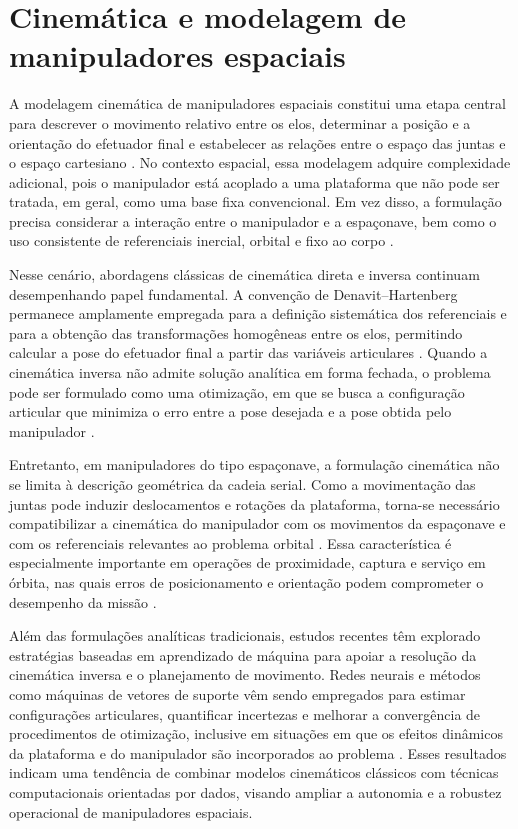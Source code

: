 \section{Cinemática e modelagem de manipuladores espaciais} %

A modelagem cinemática de manipuladores espaciais constitui uma etapa central para descrever o movimento relativo entre os elos, determinar a posição e a orientação do efetuador final e estabelecer as relações entre o espaço das juntas e o espaço cartesiano \cite{fonseca2019kinematics}. No contexto espacial, essa modelagem adquire complexidade adicional, pois o manipulador está acoplado a uma plataforma que não pode ser tratada, em geral, como uma base fixa convencional. Em vez disso, a formulação precisa considerar a interação entre o manipulador e a espaçonave, bem como o uso consistente de referenciais inercial, orbital e fixo ao corpo \cite{fonseca2019kinematics,fonseca2016dynamics}.

Nesse cenário, abordagens clássicas de cinemática direta e inversa continuam desempenhando papel fundamental. A convenção de Denavit--Hartenberg permanece amplamente empregada para a definição sistemática dos referenciais e para a obtenção das transformações homogêneas entre os elos, permitindo calcular a pose do efetuador final a partir das variáveis articulares \cite{fonseca2019kinematics}. Quando a cinemática inversa não admite solução analítica em forma fechada, o problema pode ser formulado como uma otimização, em que se busca a configuração articular que minimiza o erro entre a pose desejada e a pose obtida pelo manipulador \cite{santos2022uncertainty,santos2023physics}.

Entretanto, em manipuladores do tipo espaçonave, a formulação cinemática não se limita à descrição geométrica da cadeia serial. Como a movimentação das juntas pode induzir deslocamentos e rotações da plataforma, torna-se necessário compatibilizar a cinemática do manipulador com os movimentos da espaçonave e com os referenciais relevantes ao problema orbital \cite{fonseca2019kinematics,fonseca2016dynamics}. Essa característica é especialmente importante em operações de proximidade, captura e serviço em órbita, nas quais erros de posicionamento e orientação podem comprometer o desempenho da missão \cite{arantes2010far,fonseca2016dynamics}.

Além das formulações analíticas tradicionais, estudos recentes têm explorado estratégias baseadas em aprendizado de máquina para apoiar a resolução da cinemática inversa e o planejamento de movimento. Redes neurais e métodos como máquinas de vetores de suporte vêm sendo empregados para estimar configurações articulares, quantificar incertezas e melhorar a convergência de procedimentos de otimização, inclusive em situações em que os efeitos dinâmicos da plataforma e do manipulador são incorporados ao problema \cite{santos2022uncertainty,santos2023physics,santos2022machine}. Esses resultados indicam uma tendência de combinar modelos cinemáticos clássicos com técnicas computacionais orientadas por dados, visando ampliar a autonomia e a robustez operacional de manipuladores espaciais.

